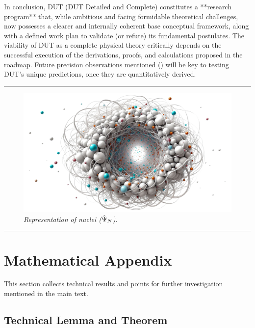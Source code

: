 \documentclass[11pt, a4paper]{article}
\theoremstyle{remark}
\newcommand{\Op}[1]{\hat{#1}}
\begin{document}
In conclusion, DUT (DUT Detailed and Complete) constitutes a **research program** that, while ambitious and facing formidable theoretical challenges, now possesses a clearer and internally coherent base conceptual framework, along with a defined work plan to validate (or refute) its fundamental postulates. The viability of DUT as a complete physical theory critically depends on the successful execution of the derivations, proofs, and calculations proposed in the roadmap. Future precision observations mentioned () will be key to testing DUT's unique predictions, once they are quantitatively derived.

\bigskip
\hrule

\vfill
\begin{figure}[htbp]
    \centering
    \includegraphics[width=0.9\linewidth]{OIG39.ZNLJ.PNG}
    \caption{%
     \footnotesize\textit{Representation of nuclei (\(\protect\Op{\Psi}_N\)).}
    }
    \label{fig:Figura20}
\end{figure}
\vfill
\bigskip
\hrule
\vfill


\appendix

\section{Mathematical Appendix}
\label{sec:apendice_matematico}

This section collects technical results and points for further investigation mentioned in the main text.

\subsection{Technical Lemma and Theorem}
\end{document}
